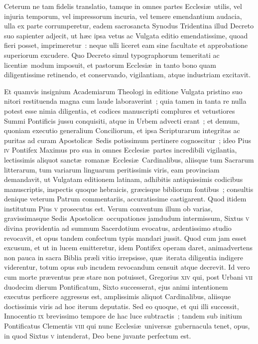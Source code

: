 Ceterum ne tam fidelis translatio, tamque in omnes partes Ecclesi\ae\ utilis, 
vel injuria temporum, vel impressorum incuria, vel temere emendantium audacia, 
ulla ex parte corrumperetur, eadem sacrosancta Synodus Tridentina illud Decreto 
suo sapienter adjecit, ut h\ae c ipsa vetus ac Vulgata editio emendatissime, 
quoad fieri posset, imprimeretur~: neque ulli liceret eam sine facultate et 
approbatione superiorum excudere. Quo Decreto simul typographorum temeritati ac 
licenti\ae\ modum imposuit, et pastorum Ecclesi\ae\ in tanto bono quam 
diligentissime retinendo, et conservando, vigilantiam, atque industriam 
excitavit.

Et quamvis insignium Academiarum Theologi in editione Vulgata pristino suo 
nitori restituenda magna cum laude laboraverint~; quia tamen in tanta re nulla 
potest esse nimia diligentia, et codices manuscripti complures et vetustiores 
Summi Pontificis jussu conquisiti, atque in Urbem advecti erant~; et demum, 
quoniam executio generalium Conciliorum, et ipsa Scripturarum integritas ac 
puritas ad curam Apostolic\ae\ Sedis potissimum pertinere cognoscitur~; ideo 
Pius \textsc{iv} Pontifex Maximus pro sua in omnes Ecclesi\ae\ partes incredibili 
vigilantia, lectissimis aliquot sanct\ae\ roman\ae\ Ecclesi\ae\ Cardinalibus, 
aliisque tum Sacrarum litterarum, tum variarum linguarum peritissimis viris, 
eam provinciam demandavit, ut Vulgatam editionem latinam, adhibitis 
antiquissimis codicibus manuscriptis, inspectis quoque hebraicis, gr\ae cisque 
bibliorum fontibus~; consultis denique veterum Patrum commentariis, 
accuratissime castigarent. Quod itidem institutum Pius \textsc{v} prosecutus est. Verum 
conventum illum ob varias, gravissimasque Sedis Apostolic\ae\ occupationes 
jamdudum intermissum, Sixtus \textsc{v} divina providentia ad summum Sacerdotium 
evocatus, ardentissimo studio revocavit, et opus tandem confectum typis mandari 
jussit. Quod cum jam esset excusum, et ut in lucem emitteretur, idem Pontifex 
operam daret, animadvertens non pauca in sacra Biblia pr\ae li vitio 
irrepsisse, qu\ae\ iterata diligentia indigere viderentur, totum opus sub 
incudem revocandum censuit atque decrevit. Id vero cum morte pr\ae ventus pr\ae 
stare non potuisset, Gregorius \textsc{xiv} qui, post Urbani \textsc{vii} duodecim dierum 
Pontificatum, Sixto successerat, ejus animi intentionem executus perficere 
aggressus est, amplissimis aliquot Cardinalibus, aliisque doctissimis viris ad 
hoc iterum deputatis. Sed eo quoque, et qui illi successit, Innocentio \textsc{ix} 
brevissimo tempore de hac luce subtractis~; tandem sub initium Pontificatus 
Clementis \textsc{viii} qui nunc Ecclesi\ae\ univers\ae\ gubernacula tenet, opus, in 
quod Sixtus \textsc{v} intenderat, Deo bene juvante perfectum est.


